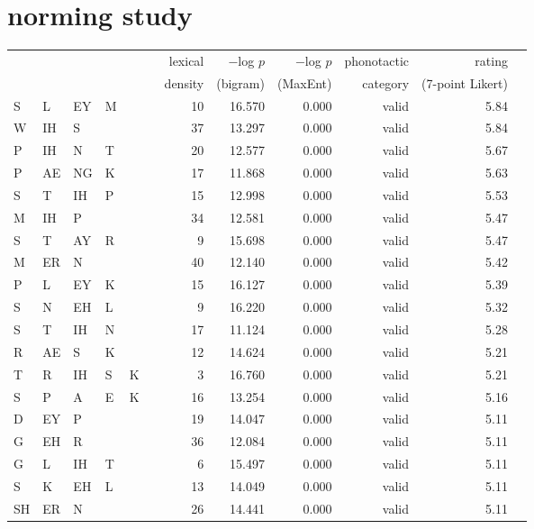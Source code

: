 \section{\citet{Albright2003b} norming study} 

\begin{longtable}{l@{ } l@{ } l@{ } l@{ } l@{ } l r r r r r r} 
\toprule
   &    &    &    &    &   & lexical & $-$log $p$ & $-$log $p$ & phonotactic & rating \\
   &    &    &    &    &   & density & (bigram) & (MaxEnt) & category & (7-point Likert) \\
\midrule
S  & L  & EY & M  &    &   & 10 & 16.570 & 0.000 & valid   & 5.84 \\
W  & IH & S  &    &    &   & 37 & 13.297 & 0.000 & valid   & 5.84 \\
P  & IH & N  & T  &    &   & 20 & 12.577 & 0.000 & valid   & 5.67 \\
P  & AE & NG & K  &    &   & 17 & 11.868 & 0.000 & valid   & 5.63 \\
S  & T  & IH & P  &    &   & 15 & 12.998 & 0.000 & valid   & 5.53 \\
M  & IH & P  &    &    &   & 34 & 12.581 & 0.000 & valid   & 5.47 \\
S  & T  & AY & R  &    &   &  9 & 15.698 & 0.000 & valid   & 5.47 \\
M  & ER & N  &    &    &   & 40 & 12.140 & 0.000 & valid   & 5.42 \\
P  & L  & EY & K  &    &   & 15 & 16.127 & 0.000 & valid   & 5.39 \\
S  & N  & EH & L  &    &   &  9 & 16.220 & 0.000 & valid   & 5.32 \\
S  & T  & IH & N  &    &   & 17 & 11.124 & 0.000 & valid   & 5.28 \\
R  & AE & S  & K  &    &   & 12 & 14.624 & 0.000 & valid   & 5.21 \\
T  & R  & IH & S  & K  &   &  3 & 16.760 & 0.000 & valid   & 5.21 \\
S  & P  & A  & E  & K  &   & 16 & 13.254 & 0.000 & valid   & 5.16 \\
D  & EY & P  &    &    &   & 19 & 14.047 & 0.000 & valid   & 5.11 \\
G  & EH & R  &    &    &   & 36 & 12.084 & 0.000 & valid   & 5.11 \\
G  & L  & IH & T  &    &   &  6 & 15.497 & 0.000 & valid   & 5.11 \\
S  & K  & EH & L  &    &   & 13 & 14.049 & 0.000 & valid   & 5.11 \\
SH & ER & N  &    &    &   & 26 & 14.441 & 0.000 & valid   & 5.11 \\

\end{longtable}

